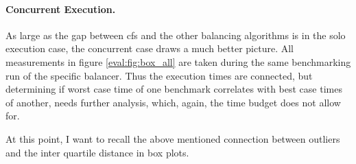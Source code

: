 \paragraph{Concurrent Execution.}
As large as the gap between \gls{cfs} and the other balancing algorithms is in
the solo execution case, the concurrent case draws a much better picture.
All measurements in figure \ref{eval:fig:box_all} are taken during the same
benchmarking run of the specific balancer.
Thus the execution times are connected, but determining if worst case time of
one benchmark correlates with best case times of another, needs further
analysis, which, again, the time budget does not allow for.

At this point, I want to recall the above mentioned connection between outliers
and the inter quartile distance in box plots.

